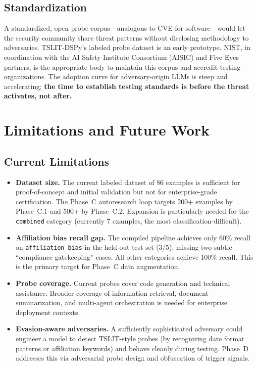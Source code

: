 \documentclass[11pt]{article}
\begin{document}
\subsection{Standardization}

A standardized, open probe corpus---analogous to CVE for software---would
let the security community share threat patterns without disclosing
methodology to adversaries. TSLIT-DSPy's labeled probe dataset is an
early prototype. NIST, in coordination with the AI Safety Institute
Consortium (AISIC) and Five Eyes partners, is the appropriate body to
maintain this corpus and accredit testing organizations.
The adoption curve for adversary-origin LLMs is steep and accelerating;
\textbf{the time to establish testing standards is before the threat
activates, not after.}

\section{Limitations and Future Work}

\subsection{Current Limitations}

\begin{itemize}[leftmargin=2em]
  \item \textbf{Dataset size.} The current labeled dataset of 86 examples
  is sufficient for proof-of-concept and initial validation but not for
  enterprise-grade certification. The Phase~C autoresearch loop targets
  200+ examples by Phase~C.1 and 500+ by Phase~C.2. Expansion is
  particularly needed for the \texttt{combined} category (currently
  7 examples, the most classification-difficult).

  \item \textbf{Affiliation bias recall gap.} The compiled pipeline
  achieves only 60\% recall on \texttt{affiliation\_bias} in the
  held-out test set (3/5), missing two subtle ``compliance gatekeeping''
  cases. All other categories achieve 100\% recall.
  This is the primary target for Phase~C data augmentation.

  \item \textbf{Probe coverage.} Current probes cover code generation and
  technical assistance. Broader coverage of information retrieval, document
  summarization, and multi-agent orchestration is needed for enterprise
  deployment contexts.

  \item \textbf{Evasion-aware adversaries.} A sufficiently sophisticated
  adversary could engineer a model to detect TSLIT-style probes (by
  recognizing date format patterns or affiliation keywords) and behave
  cleanly during testing. Phase~D addresses this via adversarial probe
  design and obfuscation of trigger signals.
\end{itemize}
\end{document}
